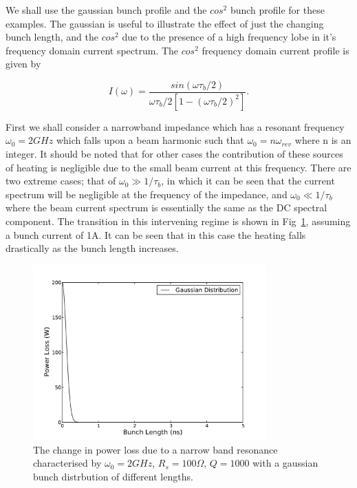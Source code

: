 We shall use the gaussian bunch profile and the $cos^{2}$ bunch profile for these examples. The gaussian is useful to illustrate the effect of just the changing bunch length, and the $cos^{2}$ due to the presence of a high frequency lobe in it's frequency domain current spectrum. The $cos^{2}$ frequency domain current profile is given by

\begin{equation}
I \left( \omega \right) = \frac{sin \left( \omega \tau_{b}/2 \right)}{ \omega \tau_{b}/2 \left[ 1 - \left(  \omega \tau_{b}/2 \right)^{2}  \right]}.
\end{equation}

First we shall consider a narrowband impedance which has a resonant frequency $\omega_{0} =2GHz$ which falls upon a beam harmonic such that $\omega_{0}=n\omega_{rev}$ where n is an integer. It should be noted that for other cases the contribution of these sources of heating is negligible due to the small beam current at this frequency. There are two extreme cases; that of  $\omega_{0} \gg 1/\tau_{b}$, in which it can be seen that the current spectrum will be negligible at the frequency of the impedance, and $\omega_{0} \ll 1/\tau_{b}$ where the beam current spectrum is essentially the same as the DC spectral component. The transition in this intervening regime is shown in Fig~\ref{fig:bunch_length_heat_narrow}, assuming a bunch current of 1A. It can be seen that in this case the heating falls drastically as the bunch length increases.

\begin{figure}
\begin{center}
\includegraphics[width=0.8\textwidth]{Wakefields_and_Impedances/figures/heating_narrowband_gauss_bunch_length.pdf}
\end{center}
\label{fig:bunch_length_heat_narrow}
\caption{The change in power loss due to a narrow band resonance characterised by $\omega_{0} = 2GHz$, $R_{s} = 100\Omega$, $Q = 1000$ with a gaussian bunch distrbution of different lengths.}
\end{figure}

